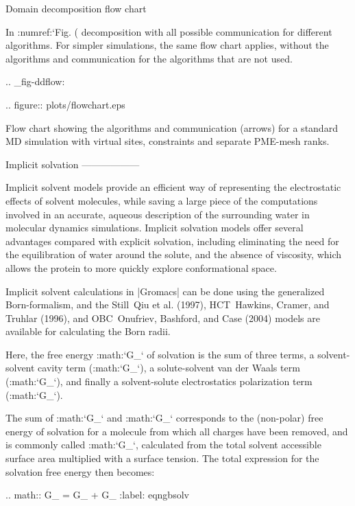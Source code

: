 {Domain decomposition flow chart
~~~~~~~~~~~~~~~~~~~~~~~~~~~~~~~

In :numref:`Fig. (%
decomposition with all possible communication for different algorithms.
For simpler simulations, the same flow chart applies, without the
algorithms and communication for the algorithms that are not used.

.. _fig-ddflow:

.. figure:: plots/flowchart.eps

   Flow chart showing the algorithms and communication (arrows)
   for a standard MD simulation with virtual sites, constraints and
   separate PME-mesh ranks.

Implicit solvation
------------------

Implicit solvent models provide an efficient way of representing the
electrostatic effects of solvent molecules, while saving a large piece
of the computations involved in an accurate, aqueous description of the
surrounding water in molecular dynamics simulations. Implicit solvation
models offer several advantages compared with explicit solvation,
including eliminating the need for the equilibration of water around the
solute, and the absence of viscosity, which allows the protein to more
quickly explore conformational space.

Implicit solvent calculations in |Gromacs| can be done using the
generalized Born-formalism, and the Still Qiu et al. (1997),
HCT Hawkins, Cramer, and Truhlar (1996), and OBC Onufriev, Bashford, and
Case (2004) models are available for calculating the Born radii.

Here, the free energy :math:`G_{}` of solvation is the sum
of three terms, a solvent-solvent cavity term
(:math:`G_{}`), a solute-solvent van der Waals term
(:math:`G_{}`), and finally a solvent-solute electrostatics
polarization term (:math:`G_{}`).

The sum of :math:`G_{}` and :math:`G_{}`
corresponds to the (non-polar) free energy of solvation for a molecule
from which all charges have been removed, and is commonly called
:math:`G_{}`, calculated from the total solvent accessible
surface area multiplied with a surface tension. The total expression for
the solvation free energy then becomes:

.. math::  G_{} = G_{}  + G_{}
           :label: eqngbsolv

}
